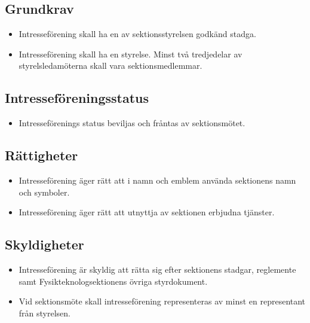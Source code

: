 \documentclass[11pt,a4paper]{article}
\begin{document}
\subsection{Grundkrav}

\begin{itemize}

  \item Intresseförening skall ha en av sektionsstyrelsen godkänd stadga.
  
   \item Intresseförening skall ha en styrelse. Minst två tredjedelar av styrelsledamöterna skall vara sektionsmedlemmar.

\end{itemize}

\subsection{Intresseföreningsstatus}

\begin{itemize}

  \item Intresseförenings status beviljas och fråntas av
  sektionsmötet.

\end{itemize}

\subsection{Rättigheter}

\begin{itemize}

  \item Intresseförening äger rätt att i namn och emblem använda
  sektionens namn och symboler.

  \item Intresseförening äger rätt att utnyttja av sektionen erbjudna
  tjänster.

\end{itemize}

\subsection{Skyldigheter}

\begin{itemize}

  
  \item Intresseförening är skyldig att rätta sig efter sektionens stadgar, reglemente samt Fysikteknologsektionens övriga styrdokument.

  
  \item Vid sektionsmöte skall intresseförening representeras av minst en representant från styrelsen.

\end{itemize}
\end{document}

